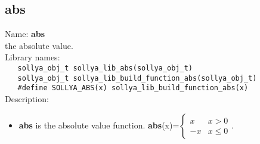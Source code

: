 \subsection{abs}
\label{lababs}
\noindent Name: \textbf{abs}\\
\phantom{aaa}the absolute value.\\[0.2cm]
\noindent Library names:\\
\verb|   sollya_obj_t sollya_lib_abs(sollya_obj_t)|\\
\verb|   sollya_obj_t sollya_lib_build_function_abs(sollya_obj_t)|\\
\verb|   #define SOLLYA_ABS(x) sollya_lib_build_function_abs(x)|\\[0.2cm]
\noindent Description: \begin{itemize}

\item \textbf{abs} is the absolute value function. \textbf{abs}(x)=$\left \lbrace \begin{array}{rl} x & x > 0 \\ -x & x \leq 0 \end{array}  \right.$.
\end{itemize}
